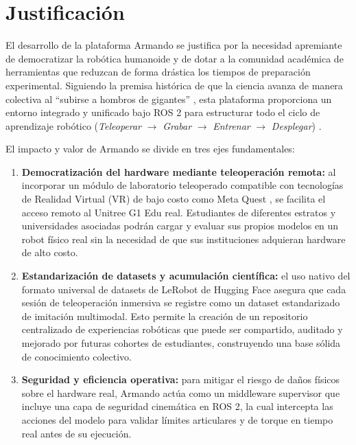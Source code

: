 \documentclass[stu,12pt,floatsintext]{apa7}
\begin{document}
\section{Justificación}

El desarrollo de la plataforma Armando se justifica por la necesidad apremiante de democratizar la robótica humanoide y de dotar a la comunidad académica de herramientas que reduzcan de forma drástica los tiempos de preparación experimental. Siguiendo la premisa histórica de que la ciencia avanza de manera colectiva al ``subirse a hombros de gigantes'' \parencite{newton1687}, esta plataforma proporciona un entorno integrado y unificado bajo ROS 2 para estructurar todo el ciclo de aprendizaje robótico (\textit{Teleoperar} $\rightarrow$ \textit{Grabar} $\rightarrow$ \textit{Entrenar} $\rightarrow$ \textit{Desplegar}) \parencite{cadene2026lerobotopensourcelibraryendtoend}.

El impacto y valor de Armando se divide en tres ejes fundamentales:
\begin{enumerate}
    \item \textbf{Democratización del hardware mediante teleoperación remota:} al incorporar un módulo de laboratorio teleoperado compatible con tecnologías de Realidad Virtual (VR) de bajo costo como Meta Quest \parencite{phosphobot2024}, se facilita el acceso remoto al Unitree G1 Edu real. Estudiantes de diferentes estratos y universidades asociadas podrán cargar y evaluar sus propios modelos en un robot físico real sin la necesidad de que sus instituciones adquieran hardware de alto costo.
    \item \textbf{Estandarización de datasets y acumulación científica:} el uso nativo del formato universal de datasets de LeRobot de Hugging Face \parencite{cadene2026lerobotopensourcelibraryendtoend} asegura que cada sesión de teleoperación inmersiva se registre como un dataset estandarizado de imitación multimodal. Esto permite la creación de un repositorio centralizado de experiencias robóticas que puede ser compartido, auditado y mejorado por futuras cohortes de estudiantes, construyendo una base sólida de conocimiento colectivo.
    \item \textbf{Seguridad y eficiencia operativa:} para mitigar el riesgo de daños físicos sobre el hardware real, Armando actúa como un middleware supervisor que incluye una capa de seguridad cinemática en ROS 2, la cual intercepta las acciones del modelo para validar límites articulares y de torque en tiempo real antes de su ejecución.
\end{enumerate}
\end{document}
